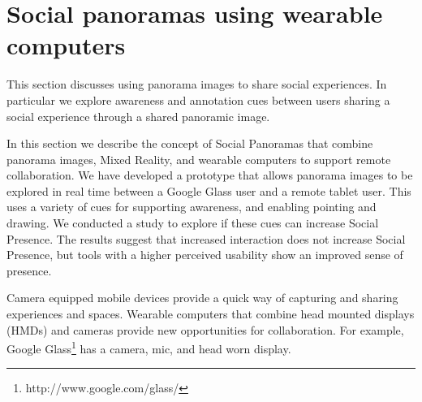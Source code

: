 \section{Social panoramas using wearable computers}
\label{sec:pano}

This section discusses using panorama images to share social experiences. In particular we explore awareness and annotation cues between users sharing a social experience through a shared panoramic image.







In this section we describe the concept of Social Panoramas that combine panorama images, Mixed Reality, and wearable computers to support remote collaboration. We have developed a prototype that allows panorama images to be explored in real time between a Google Glass user and a remote tablet user. This uses a variety of cues for supporting awareness, and enabling pointing and drawing. We conducted a study to explore if these cues can increase Social Presence. The results suggest that increased interaction does not increase Social Presence, but tools with a higher perceived usability show an improved sense of presence.


Camera equipped mobile devices provide a quick way of capturing and sharing experiences and spaces. Wearable
computers that combine head mounted displays (HMDs) and cameras provide new opportunities for collaboration. For example, Google Glass\footnote{http://www.google.com/glass/} has a camera, mic, and head worn display.


